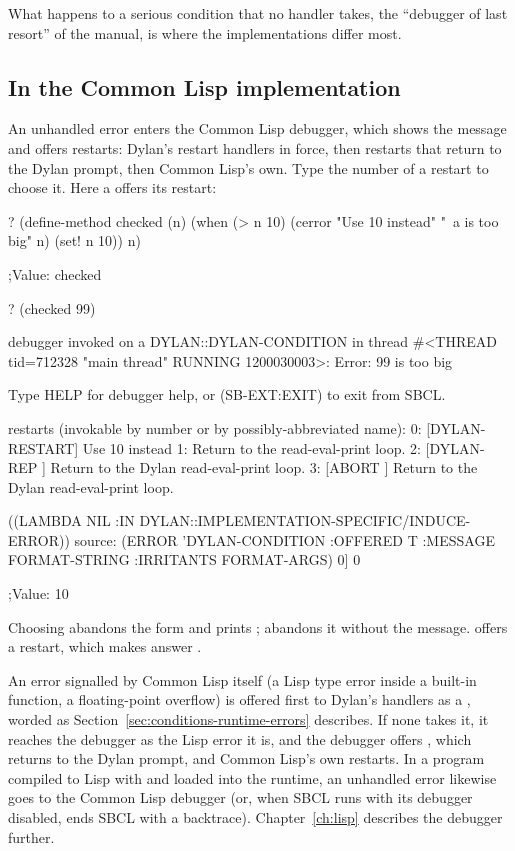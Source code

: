 What happens to a serious condition that no handler takes, the
``debugger of last resort'' of the manual, is where the implementations
differ most.

\subsection{In the Common Lisp implementation}

An unhandled error enters the Common Lisp debugger, which shows the
message and offers restarts: Dylan's restart handlers in force, then
restarts that return to the Dylan prompt, then Common Lisp's own. Type
the number of a restart to choose it. Here a  offers its
restart:

\begin{repl}
? (define-method checked (n)
    (when (> n 10)
      (cerror "Use 10 instead" "~a is too big" n)
      (set! n 10))
    n)

;Value: checked

? (checked 99)

debugger invoked on a DYLAN::DYLAN-CONDITION in thread
#<THREAD tid=712328 "main thread" RUNNING {1200030003}>:
  Error: 99 is too big

Type HELP for debugger help, or (SB-EXT:EXIT) to exit from SBCL.

restarts (invokable by number or by possibly-abbreviated name):
  0: [DYLAN-RESTART] Use 10 instead
  1:                 Return to the read-eval-print loop.
  2: [DYLAN-REP    ] Return to the Dylan read-eval-print loop.
  3: [ABORT        ] Return to the Dylan read-eval-print loop.

((LAMBDA NIL :IN DYLAN::IMPLEMENTATION-SPECIFIC/INDUCE-ERROR))
   source: (ERROR 'DYLAN-CONDITION :OFFERED T :MESSAGE FORMAT-STRING :IRRITANTS
                  FORMAT-ARGS)
0] 0

;Value: 10
\end{repl}

\noindent Choosing  abandons the
form and prints ;  abandons it
without the message.  offers a 
restart, which makes  answer .

An error signalled by Common Lisp itself (a Lisp type error inside a
built-in function, a floating-point overflow) is offered first to Dylan's
handlers as a , worded as
Section~\ref{sec:conditions-runtime-errors} describes. If none takes it, it reaches the debugger as the
Lisp error it is, and the debugger offers , which
returns to the Dylan prompt, and Common Lisp's own restarts. In a program compiled to Lisp with
 and loaded into the runtime, an unhandled error
likewise goes to the Common Lisp debugger (or, when SBCL runs with its
debugger disabled, ends SBCL with a backtrace). Chapter~\ref{ch:lisp} describes the debugger further.

